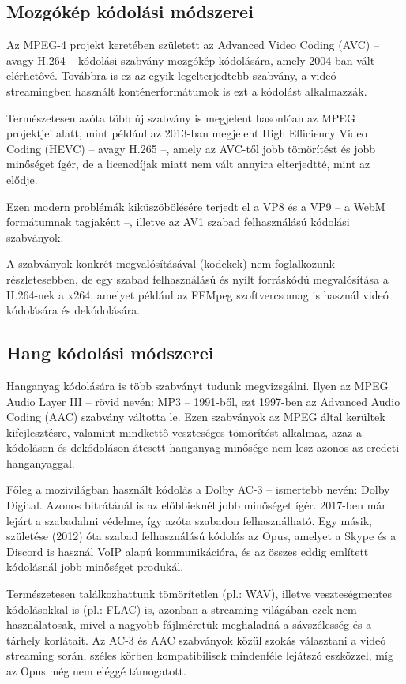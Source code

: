 \subsection{Mozgókép kódolási módszerei}

Az MPEG-4 projekt keretében született az Advanced Video Coding (AVC) -- avagy H.264 -- kódolási szabvány mozgókép kódolására, amely 2004-ban vált elérhetővé. Továbbra is ez az egyik legelterjedtebb szabvány, a videó streamingben használt konténerformátumok is ezt a kódolást alkalmazzák.

Természetesen azóta több új szabvány is megjelent hasonlóan az MPEG projektjei alatt, mint például az 2013-ban megjelent High Efficiency Video Coding (HEVC) -- avagy H.265 --, amely az AVC-től jobb tömörítést és jobb minőséget ígér, de a licencdíjak miatt nem vált annyira elterjedtté, mint az elődje.

Ezen modern problémák kiküszöbölésére terjedt el a VP8 és a VP9 -- a WebM formátumnak tagjaként --, illetve az AV1 szabad felhasználású kódolási szabványok.

A szabványok konkrét megvalósításával (kodekek) nem foglalkozunk részletesebben, de egy szabad felhasználású és nyílt forráskódú megvalósítása a H.264-nek a x264, amelyet például az FFMpeg szoftvercsomag is használ videó kódolására és dekódolására.

\subsection{Hang kódolási módszerei}

Hanganyag kódolására is több szabványt tudunk megvizsgálni. Ilyen az MPEG Audio Layer III -- rövid nevén: MP3 -- 1991-ből, ezt 1997-ben az Advanced Audio Coding (AAC) szabvány váltotta le. Ezen szabványok az MPEG által kerültek kifejlesztésre, valamint mindkettő veszteséges tömörítést alkalmaz, azaz a kódoláson és dekódoláson átesett hanganyag minősége nem lesz azonos az eredeti hanganyaggal.

Főleg a mozivilágban használt kódolás a Dolby AC-3  -- ismertebb nevén: Dolby Digital. Azonos bitrátánál is az előbbieknél jobb minőséget ígér. 2017-ben már lejárt a szabadalmi védelme, így azóta szabadon felhasználható. Egy másik, születése (2012) óta szabad felhasználású kódolás az Opus, amelyet a Skype és a Discord is használ VoIP alapú kommunikációra, és az összes eddig említett kódolásnál jobb minőséget produkál.

Természetesen találkozhattunk tömörítetlen (pl.: WAV), illetve veszteségmentes kódolásokkal is (pl.: FLAC) is, azonban a streaming világában ezek nem használatosak, mivel a nagyobb fájlméretük meghaladná a sávszélesség és a tárhely korlátait. Az AC-3 és AAC szabványok közül szokás választani a videó streaming során, széles körben kompatibilisek mindenféle lejátszó eszközzel, míg az Opus még nem eléggé támogatott.

